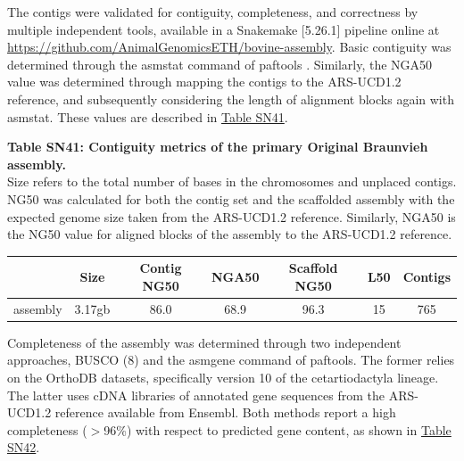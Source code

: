 \documentclass[../main.tex]{subfiles}
\begin{document}
\begin{flushleft}
\bigskip

The contigs were validated for contiguity, completeness, and correctness by multiple independent tools, available in a Snakemake [5.26.1] \citep{koster2012snakemake} pipeline online at \url{https://github.com/AnimalGenomicsETH/bovine-assembly}. Basic contiguity was determined through the asmstat command of paftools \citep{li2018minimap2}. Similarly, the NGA50 value was determined through mapping the contigs to the ARS-UCD1.2 reference, and subsequently considering the length of alignment blocks again with asmstat. These values are described in \hyperlink{Table SN41}{Table SN41}.

\bigskip

\textbf{\hypertarget{Table SN41}{Table SN41}: Contiguity metrics of the primary Original Braunvieh assembly.} \\
\footnotesize{Size refers to the total number of bases in the chromosomes and unplaced contigs. NG50 was calculated for both the contig set and the scaffolded assembly with the expected genome size taken from the ARS-UCD1.2 reference. Similarly, NGA50 is the NG50 value for aligned blocks of the assembly to the ARS-UCD1.2 reference.}
\begin{center}
    \begin{tabular}{|c|c|c|c|c|c|c|}
    \hline
    ~        & Size   & Contig NG50 & NGA50 & Scaffold NG50 & L50 & Contigs  \\
    \hline
    assembly & 3.17gb & 86.0        & 68.9  & 96.3          & 15  & 765      \\
    \hline
    \end{tabular}
\end{center}

\normalsize

Completeness of the assembly was determined through two independent approaches, BUSCO (8) and the asmgene command of paftools. The former relies on the OrthoDB datasets, specifically version 10 of the cetartiodactyla lineage. The latter uses cDNA libraries of annotated gene sequences from the ARS-UCD1.2 reference available from Ensembl. Both methods report a high completeness ($>$96\%) with respect to predicted gene content, as shown in \hyperlink{Table SN42}{Table SN42}.

\newpage


\end{flushleft}
\end{document}
